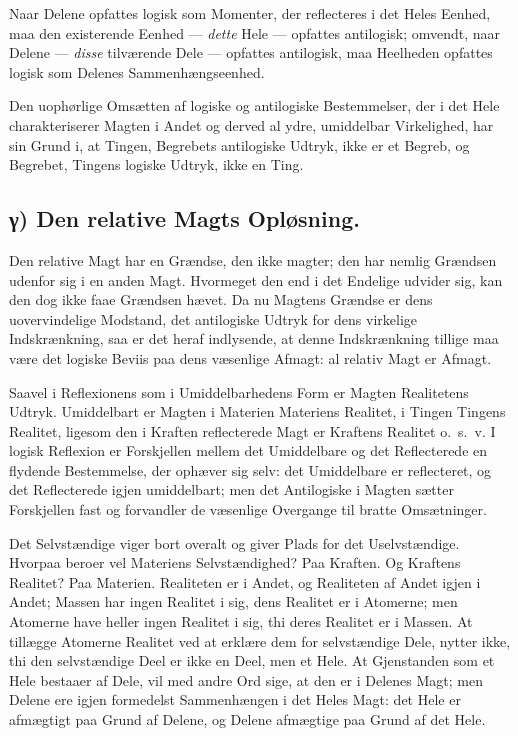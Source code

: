\documentclass[12pt]{book}
\newcommand{\opage}[1]{\marginnote{\footnotesize\textit{[#1]}}}
\begin{document}
Naar Delene opfattes logisk som Momenter, der
reflecteres i det Heles Eenhed, maa den existerende Eenhed ---
\emph{dette} Hele --- opfattes antilogisk; omvendt, naar Delene ---
\opage{36} \emph{disse} tilværende Dele --- opfattes antilogisk, maa Heelheden
opfattes logisk som Delenes Sammenhængseenhed.

Den uophørlige Omsætten af logiske og antilogiske
Bestemmelser, der i det Hele charakteriserer Magten i Andet
og derved al ydre, umiddelbar Virkelighed, har sin Grund
i, at Tingen, Begrebets antilogiske Udtryk, ikke er et
Begreb, og Begrebet, Tingens logiske Udtryk, ikke en Ting.

\subsection*{γ) Den relative Magts Opløsning.}

Den relative
Magt har en Grændse, den ikke magter; den har nemlig
Grændsen udenfor sig i en anden Magt. Hvormeget
den end i det Endelige udvider sig, kan den dog ikke faae
Grændsen hævet. Da nu Magtens Grændse er dens
uovervindelige Modstand, det antilogiske Udtryk for dens virkelige
Indskrænkning, saa er det heraf indlysende, at denne
Indskrænkning tillige maa være det logiske Beviis paa dens
væsenlige Afmagt: al relativ Magt er Afmagt.

Saavel i Reflexionens som i Umiddelbarhedens Form
er Magten Realitetens Udtryk. Umiddelbart er Magten i
Materien Materiens Realitet, i Tingen Tingens Realitet,
ligesom den i Kraften reflecterede Magt er Kraftens
Realitet o.~s.~v. I logisk Reflexion er Forskjellen mellem det
Umiddelbare og det Reflecterede en flydende Bestemmelse, der
ophæver sig selv: det Umiddelbare er reflecteret, og det
Reflecterede igjen umiddelbart; men det Antilogiske i Magten
sætter Forskjellen fast og forvandler de væsenlige Overgange
til bratte Omsætninger.

Det Selvstændige viger bort overalt og giver Plads for
det Uselvstændige. Hvorpaa beroer vel Materiens
Selvstændighed? Paa Kraften. Og Kraftens Realitet? Paa
Materien. Realiteten er i Andet, og Realiteten af Andet igjen i
Andet; Massen har ingen Realitet i sig, dens Realitet er i
Atomerne; men Atomerne have heller ingen Realitet i sig,
thi deres Realitet er i Massen. At tillægge Atomerne
Realitet ved at erklære dem for selvstændige Dele, nytter ikke, thi
\opage{37} den selvstændige Deel er ikke en Deel, men et Hele. At
Gjenstanden som et Hele bestaaer af Dele, vil med andre
Ord sige, at den er i Delenes Magt; men Delene ere igjen
formedelst Sammenhængen i det Heles Magt: det Hele er
afmægtigt paa Grund af Delene, og Delene afmægtige paa
Grund af det Hele.
\end{document}
